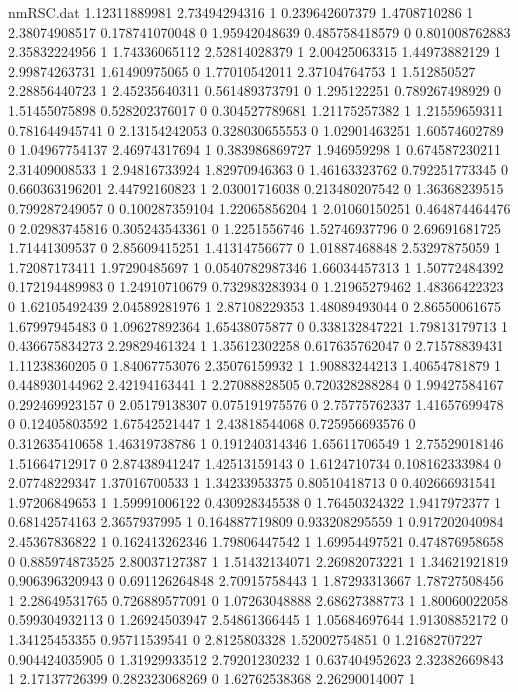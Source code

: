 \begin{filecontents}{nmRSC.dat}
1.12311889981 2.73494294316 1
0.239642607379 1.4708710286 1
2.38074908517 0.178741070048 0
1.95942048639 0.485758418579 0
0.801008762883 2.35832224956 1
1.74336065112 2.52814028379 1
2.00425063315 1.44973882129 1
2.99874263731 1.61490975065 0
1.77010542011 2.37104764753 1
1.512850527 2.28856440723 1
2.45235640311 0.561489373791 0
1.295122251 0.789267498929 0
1.51455075898 0.528202376017 0
0.304527789681 1.21175257382 1
1.21559659311 0.781644945741 0
2.13154242053 0.328030655553 0
1.02901463251 1.60574602789 0
1.04967754137 2.46974317694 1
0.383986869727 1.946959298 1
0.674587230211 2.31409008533 1
2.94816733924 1.82970946363 0
1.46163323762 0.792251773345 0
0.660363196201 2.44792160823 1
2.03001716038 0.213480207542 0
1.36368239515 0.799287249057 0
0.100287359104 1.22065856204 1
2.01060150251 0.464874464476 0
2.02983745816 0.305243543361 0
1.2251556746 1.52746937796 0
2.69691681725 1.71441309537 0
2.85609415251 1.41314756677 0
1.01887468848 2.53297875059 1
1.72087173411 1.97290485697 1
0.0540782987346 1.66034457313 1
1.50772484392 0.172194489983 0
1.24910710679 0.732983283934 0
1.21965279462 1.48366422323 0
1.62105492439 2.04589281976 1
2.87108229353 1.48089493044 0
2.86550061675 1.67997945483 0
1.09627892364 1.65438075877 0
0.338132847221 1.79813179713 1
0.436675834273 2.29829461324 1
1.35612302258 0.617635762047 0
2.71578839431 1.11238360205 0
1.84067753076 2.35076159932 1
1.90883244213 1.40654781879 1
0.448930144962 2.42194163441 1
2.27088828505 0.720328288284 0
1.99427584167 0.292469923157 0
2.05179138307 0.075191975576 0
2.75775762337 1.41657699478 0
0.12405803592 1.67542521447 1
2.43818544068 0.725956693576 0
0.312635410658 1.46319738786 1
0.191240314346 1.65611706549 1
2.75529018146 1.51664712917 0
2.87438941247 1.42513159143 0
1.6124710734 0.108162333984 0
2.07748229347 1.37016700533 1
1.34233953375 0.80510418713 0
0.402666931541 1.97206849653 1
1.59991006122 0.430928345538 0
1.76450324322 1.9417972377 1
0.68142574163 2.3657937995 1
0.164887719809 0.933208295559 1
0.917202040984 2.45367836822 1
0.162413262346 1.79806447542 1
1.69954497521 0.474876958658 0
0.885974873525 2.80037127387 1
1.51432134071 2.26982073221 1
1.34621921819 0.906396320943 0
0.691126264848 2.70915758443 1
1.87293313667 1.78727508456 1
2.28649531765 0.726889577091 0
1.07263048888 2.68627388773 1
1.80060022058 0.599304932113 0
1.26924503947 2.54861366445 1
1.05684697644 1.91308852172 0
1.34125453355 0.95711539541 0
2.8125803328 1.52002754851 0
1.21682707227 0.904424035905 0
1.31929933512 2.79201230232 1
0.637404952623 2.32382669843 1
2.17137726399 0.282323068269 0
1.62762538368 2.26290014007 1

\end{filecontents}
